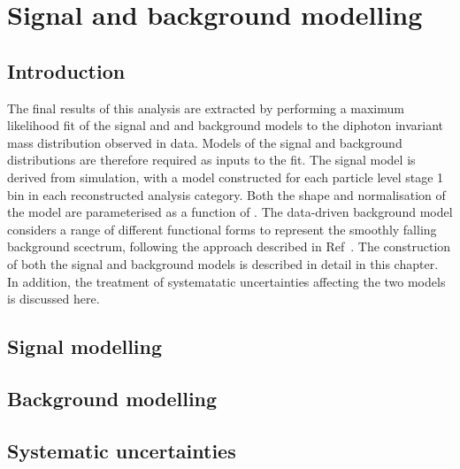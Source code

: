 \chapter{Signal and background modelling}
\label{chap:sigbkg}

\section{Introduction}

The final results of this analysis are extracted by performing a maximum likelihood fit 
of the signal and and background models to the diphoton invariant mass distribution observed in data.
Models of the signal and background \mgg distributions are therefore required as inputs to the fit.
The signal model is derived from simulation, 
with a model constructed for each particle level stage 1 bin in each reconstructed analysis category.
Both the shape and normalisation of the model are parameterised as a function of \mH.
The data-driven background model considers a range of different functional forms to 
represent the smoothly falling background scectrum, 
following the approach described in Ref~\cite{Envelope}.
The construction of both the signal and background models is described in detail in this chapter.
In addition, the treatment of systematatic uncertainties affecting the two models is discussed here.

\section{Signal modelling}

\section{Background modelling}

\section{Systematic uncertainties}
